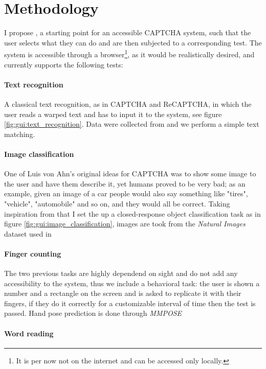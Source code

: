 \section{Methodology}
I propose \name, a starting point for an accessible CAPTCHA system, such that the user selects what they can do and are then subjected to a corresponding test.
The system is accessible through a browser\footnote{It is per now not on the internet and can be accessed only locally.}, as it would be realistically desired, and currently supports the following tests:

\paragraph{Text recognition}
A classical text recognition, as in CAPTCHA and ReCAPTCHA, in which the user reads a warped text and has to input it to the system, see figure \ref{fig:gui:text_recognition}.
Data were collected from \cite{wilhemy2013dataset,gregwar2022captcha} and we perform a simple text matching.

\paragraph{Image classification}
One of Luis von Ahn's original ideas for CAPTCHA was to show some image to the user and have them describe it, yet humans proved to be very bad; as an example, given an image of a car people would also say something like "tires", "vehicle", "automobile" and so on, and they would all be correct.
Taking inspiration from that I set the up a closed-response object classification task as in figure \ref{fig:gui:image_classification}, images are took from the \emph{Natural Images} dataset used in \cite{roy2018deep}

\paragraph{Finger counting}
The two previous tasks are highly dependend on sight and do not add any accessibility to the system, thus we include a behavioral task: the user is shown a number and a rectangle on the screen and is asked to replicate it with their fingers, if they do it correctly for a customizable interval of time then the test is passed.
Hand pose prediction is done through \emph{MMPOSE}~\cite{mmpose}



\paragraph{Word reading}


